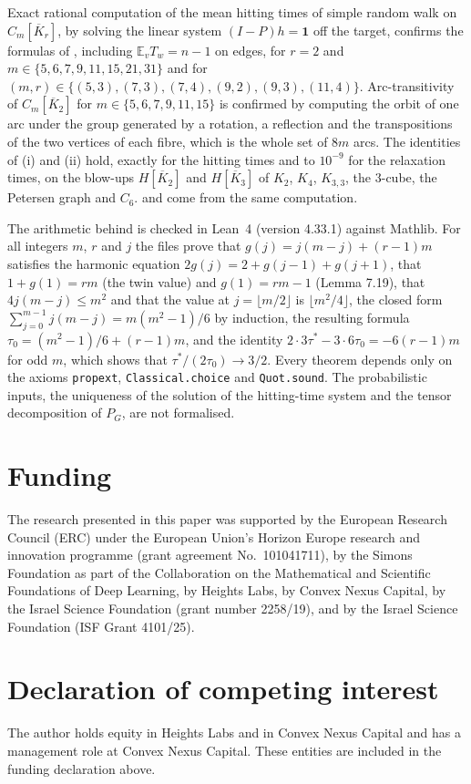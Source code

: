 \documentclass[11pt]{amsart}
\theoremstyle{definition}
\newcommand{\E}{\mathbb{E}}
\newcommand{\Kbar}{\overline{K}}
\begin{document}
Exact rational computation of the mean hitting times of simple random walk on $C_m[\Kbar_r]$, by solving the linear system $(I-P)h=\mathbf 1$ off the target, confirms the formulas of , including $\E_vT_w=n-1$ on edges, for $r=2$ and $m\in\{5,6,7,9,11,15,21,31\}$ and for $(m,r)\in\{(5,3),(7,3),(7,4),(9,2),(9,3),(11,4)\}$. Arc-transitivity of $C_m[\Kbar_2]$ for $m\in\{5,6,7,9,11,15\}$ is confirmed by computing the orbit of one arc under the group generated by a rotation, a reflection and the transpositions of the two vertices of each fibre, which is the whole set of $8m$ arcs. The identities of (i) and (ii) hold, exactly for the hitting times and to $10^{-9}$ for the relaxation times, on the blow-ups $H[\Kbar_2]$ and $H[\Kbar_3]$ of $K_2$, $K_4$, $K_{3,3}$, the $3$-cube, the Petersen graph and $C_6$.  and  come from the same computation.

The arithmetic behind  is checked in Lean~4 (version 4.33.1) against Mathlib. For all integers $m$, $r$ and $j$ the files prove that $g(j)=j(m-j)+(r-1)m$ satisfies the harmonic equation $2g(j)=2+g(j-1)+g(j+1)$, that $1+g(1)=rm$ (the twin value) and $g(1)=rm-1$ (Lemma 7.19), that $4j(m-j)\le m^2$ and that the value at $j=\lfloor m/2\rfloor$ is $\lfloor m^2/4\rfloor$, the closed form $\sum_{j=0}^{m-1}j(m-j)=m(m^2-1)/6$ by induction, the resulting formula $\tau_0=(m^2-1)/6+(r-1)m$, and the identity $2\cdot3\tau^*-3\cdot6\tau_0=-6(r-1)m$ for odd $m$, which shows that $\tau^*/(2\tau_0)\to3/2$. Every theorem depends only on the axioms \texttt{propext}, \texttt{Classical.choice} and \texttt{Quot.sound}. The probabilistic inputs, the uniqueness of the solution of the hitting-time system and the tensor decomposition of $P_G$, are not formalised.

\section*{Funding}
The research presented in this paper was supported by the European Research Council (ERC) under the European Union's Horizon Europe research and innovation programme (grant agreement No.~101041711), by the Simons Foundation as part of the Collaboration on the Mathematical and Scientific Foundations of Deep Learning, by Heights Labs, by Convex Nexus Capital, by the Israel Science Foundation (grant number 2258/19), and by the Israel Science Foundation (ISF Grant 4101/25).

\section*{Declaration of competing interest}
The author holds equity in Heights Labs and in Convex Nexus Capital and has a management role at Convex Nexus Capital. These entities are included in the funding declaration above.
\end{document}
